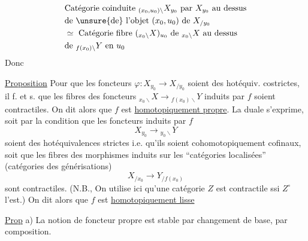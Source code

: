 \[
 \begin{aligned}
 &\text{Catégorie coinduite }{}_{(x_0,u_0)\backslash} X_{y_0}\text{ par }X_{y_0}\text{ au dessus}\\
 &\text{de \unsure{de} l'objet }(x_0,u_0)\text{ de }X_{/y_0}\\
 &\simeq\text{ Catégorie fibre }({}_{x_0\backslash}X)_{u_0}\text{ de }{}_{x_0\backslash}X\text{ au dessus}\\
 &\text{de } {}_{f(x_0)\backslash}Y\text{ en }u_0
 \end{aligned}
\]
Donc

\uline{Proposition} Pour que les foncteurs $\varphi:X_{y_0}\to X_{/y_0}$  soient des hotéquiv. costrictes, il f. et s. que les fibres des foncteurs ${}_{x_0\backslash}X\longrightarrow {}_{f(x_0)\backslash}Y$ induits par $f$ soient contractiles.
On dit alors que $f$ est \uline{homotopiquement propre}. La   duale s'exprime, soit par la condition que les foncteurs induits par $f$
\[
 X_{y_0}\longrightarrow {}_{y_0\backslash}Y
\]
soient des hotéquivalences strictes i.e. qu'ils soient cohomotopiquement cofinaux, soit que les fibres des morphismes induits sur les ``catégories localisées'' (catégories des générisations)
\[
 X_{/x_0}\longrightarrow Y_{/f(x_0)}
\]
sont contractiles. (N.B., On utilise ici qu'une catégorie $Z$ est contractile ssi $Z^\circ$ l'est.) On dit alors que $f$ est \uline{homotopiquement lisse}

\uline{Prop} a) La notion de foncteur propre  est stable par changement de base, par composition.  


